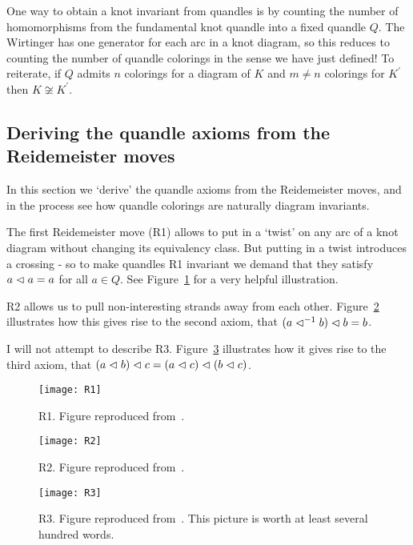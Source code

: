 \documentclass[paper.tex]{subfiles}
\begin{document}
One way to obtain a knot invariant from quandles is by counting the number of homomorphisms from the fundamental knot quandle into a fixed quandle $Q$. The Wirtinger has one generator for each arc in a knot diagram, so
this reduces to counting the number of quandle colorings in the sense we have just defined! To reiterate, if $Q$ admits $n$ colorings for a diagram of $K$ and $m \neq n$ colorings for $K^\prime$ then $K \not\cong K^\prime$.


\subsection{Deriving the quandle axioms from the Reidemeister moves}
\label{sec:quandle_axioms}

In this section we `derive' the quandle axioms from the Reidemeister moves, and in the process see how quandle colorings are naturally diagram invariants.

The first Reidemeister move (R1) allows to put in a `twist' on any arc of a knot diagram without changing its equivalency class. But putting in a twist introduces a crossing - so to make quandles R1 invariant we demand that
they satisfy $a \vartriangleleft a = a$ for all $a \in Q$. See Figure~\ref{fig:r1} for a very helpful illustration.

R2 allows us to pull non-interesting strands away from each other. Figure~\ref{fig:r2} illustrates how this gives rise to the second axiom, that $(a \vartriangleleft^{-1} b) \vartriangleleft b = b$.

I will not attempt to describe R3. Figure~\ref{fig:r3} illustrates how it gives rise to the third axiom, that $(a \vartriangleleft b) \vartriangleleft c =  (a \vartriangleleft c) \vartriangleleft (b \vartriangleleft c)$.

\begin{figure}[h]
  \centering
  \texttt{[image: R1]}
  \caption{R1. Figure reproduced from~\cite{Cusick}. }\label{fig:r1}
\end{figure}

\begin{figure}[h]
  \centering
  \texttt{[image: R2]}
  \caption{R2. Figure reproduced from~\cite{Cusick}.}\label{fig:r2}
\end{figure}

\begin{figure}[h]
  \centering
  \texttt{[image: R3]}
  \caption{R3. Figure reproduced from~\cite{Cusick}. This picture is worth at least several hundred words.}\label{fig:r3}
\end{figure}
\end{document}

